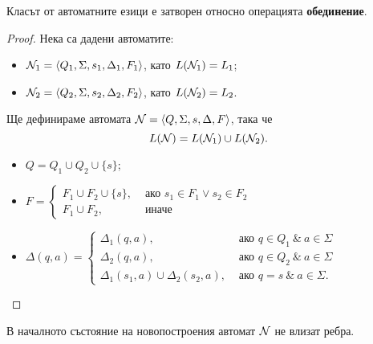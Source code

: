 \begin{lemma}
  Класът от автоматните езици е затворен относно операцията {\bf обединение}.
\end{lemma}
\begin{proof}
  Нека са дадени автоматите:
  \begin{itemize}
  \item 
    $\mathcal{N}_1 = \langle{Q_1,\Sigma,s_1,\Delta_1,F_1}\rangle$, като $L(\mathcal{N}_1) = L_1$;
  \item
    $\mathcal{N}_2=\langle{Q_2,\Sigma,s_2,\Delta_2,F_2}\rangle$, като $L(\mathcal{N}_2) = L_2$.
  \end{itemize}
  Ще дефинираме автомата $\mathcal{N}=\langle{Q,\Sigma,s,\Delta,F}\rangle$, така че
  \[L(\mathcal{N}) = L(\mathcal{N}_1) \cup L(\mathcal{N}_2).\]
  \begin{itemize}
  \item 
    $Q = Q_1 \cup Q_2 \cup \{s\}$;
  \item
    $F = 
    \begin{cases}
      F_1 \cup F_2 \cup \{s\}, & \text{ ако } s_1 \in F_1 \vee s_2 \in F_2\\
      F_1 \cup F_2,            & \text{ иначе } 
    \end{cases}$
  \item
    $
    \Delta(q,a) = 
    \begin{cases}
      \Delta_1(q,a),                       & \text{ ако } q\in Q_1\ \&\ a\in\Sigma\\
      \Delta_2(q,a),                       & \text{ ако } q\in Q_2\ \&\  a\in\Sigma\\
      \Delta_1(s_1,a) \cup \Delta_2(s_2,a), & \text{ ако } q = s\ \&\  a \in\Sigma.
    \end{cases}
    $
  \end{itemize}
\end{proof}
\begin{remark}
  В началното състояние на новопостроения автомат $\mathcal{N}$ не влизат ребра.
\end{remark}


